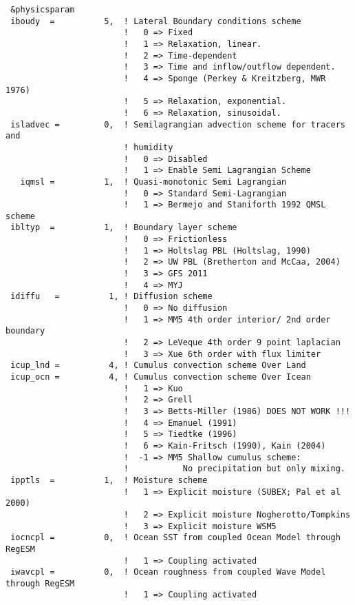 {\footnotesize
\begin{Verbatim}
 &physicsparam
 iboudy  =          5,  ! Lateral Boundary conditions scheme
                        !   0 => Fixed
                        !   1 => Relaxation, linear.
                        !   2 => Time-dependent
                        !   3 => Time and inflow/outflow dependent.
                        !   4 => Sponge (Perkey & Kreitzberg, MWR 1976)
                        !   5 => Relaxation, exponential.
                        !   6 => Relaxation, sinusoidal.
 isladvec =         0,  ! Semilagrangian advection scheme for tracers and
                        ! humidity
                        !   0 => Disabled
                        !   1 => Enable Semi Lagrangian Scheme
   iqmsl =          1,  ! Quasi-monotonic Semi Lagrangian
                        !   0 => Standard Semi-Lagrangian
                        !   1 => Bermejo and Staniforth 1992 QMSL scheme
 ibltyp  =          1,  ! Boundary layer scheme
                        !   0 => Frictionless
                        !   1 => Holtslag PBL (Holtslag, 1990)
                        !   2 => UW PBL (Bretherton and McCaa, 2004)
                        !   3 => GFS 2011
                        !   4 => MYJ
 idiffu   =          1, ! Diffusion scheme
                        !   0 => No diffusion
                        !   1 => MM5 4th order interior/ 2nd order boundary
                        !   2 => LeVeque 4th order 9 point laplacian 
                        !   3 => Xue 6th order with flux limiter
 icup_lnd =          4, ! Cumulus convection scheme Over Land
 icup_ocn =          4, ! Cumulus convection scheme Over Icean
                        !   1 => Kuo
                        !   2 => Grell
                        !   3 => Betts-Miller (1986) DOES NOT WORK !!!
                        !   4 => Emanuel (1991)
                        !   5 => Tiedtke (1996)
                        !   6 => Kain-Fritsch (1990), Kain (2004)
                        !  -1 => MM5 Shallow cumulus scheme:
                        !           No precipitation but only mixing.
 ipptls  =          1,  ! Moisture scheme
                        !   1 => Explicit moisture (SUBEX; Pal et al 2000)
                        !   2 => Explicit moisture Nogherotto/Tompkins
                        !   3 => Explicit moisture WSM5
 iocncpl =          0,  ! Ocean SST from coupled Ocean Model through RegESM
                        !   1 => Coupling activated
 iwavcpl =          0,  ! Ocean roughness from coupled Wave Model through RegESM
                        !   1 => Coupling activated

\end{Verbatim}}

